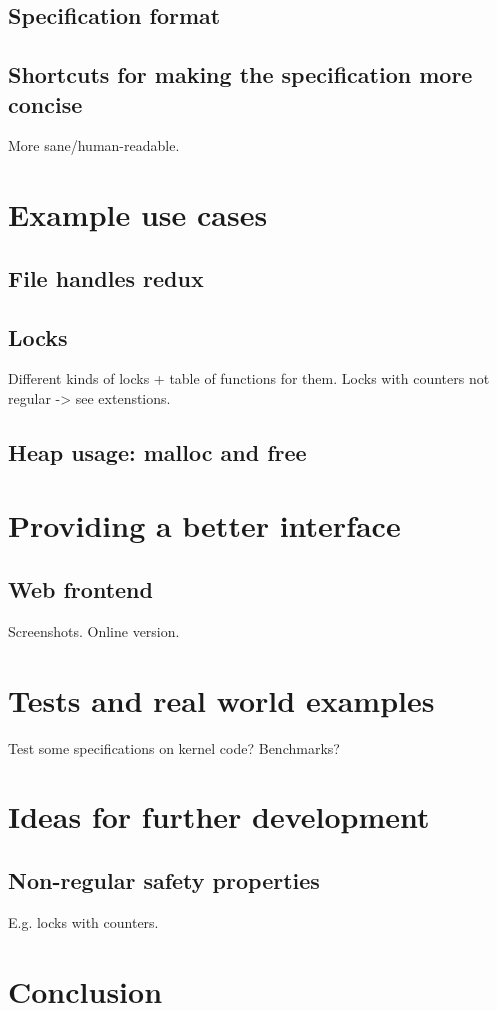 \section{Specification format}

\section{Shortcuts for making the specification more concise}
More sane/human-readable.


\chapter{Example use cases}
\section{File handles redux}

\section{Locks}
Different kinds of locks + table of functions for them.
Locks with counters not regular -> see extenstions.

\section{Heap usage: malloc and free}


\chapter{Providing a better interface}
\section{Web frontend}
Screenshots.
Online version.


\chapter{Tests and real world examples}
Test some specifications on kernel code?
Benchmarks?


\chapter{Ideas for further development}
\section{Non-regular safety properties}
E.g. locks with counters.


\chapter{Conclusion}

